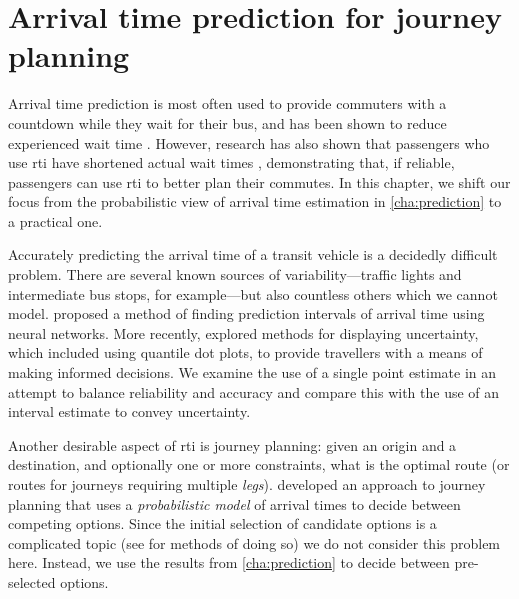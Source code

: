
\chapter{Arrival time prediction for journey planning}
\label{cha:etas}


Arrival time prediction is most often used to provide commuters with a countdown while they wait for their bus, and has been shown to reduce experienced wait time \citep{TCRP_2003}. However, research has also shown that passengers who use \gls{rti} have shortened actual wait times \citep{Lu_2017}, demonstrating that, if reliable, passengers can use \gls{rti} to better plan their commutes. In this chapter, we shift our focus from the probabilistic view of arrival time estimation in \cref{cha:prediction} to a practical one.


Accurately predicting the arrival time of a transit vehicle is a decidedly difficult problem. There are several known sources of variability---traffic lights and intermediate bus stops, for example---but also countless others which we cannot model. \citet{Mazloumi_2011} proposed a method of finding prediction intervals of arrival time using neural networks. More recently, \citet{Fernandes_2018} explored methods for displaying uncertainty, which included using quantile dot plots, to provide travellers with a means of making informed decisions. We examine the use of a single point estimate in an attempt to balance reliability and accuracy and compare this with the use of an interval estimate to convey uncertainty.


Another desirable aspect of \gls{rti} is journey planning: given an origin and a destination, and optionally one or more constraints, what is the optimal route (or routes for journeys requiring multiple \emph{legs}).  developed an approach to journey planning that uses a \emph{probabilistic model} of arrival times to decide between competing options. Since the initial selection of candidate options is a complicated topic (see \citet{Hame_2013a,Hame_2013b,Zheng_2016} for methods of doing so) we do not consider this problem here. Instead, we use the results from \cref{cha:prediction} to decide between pre-selected options.


